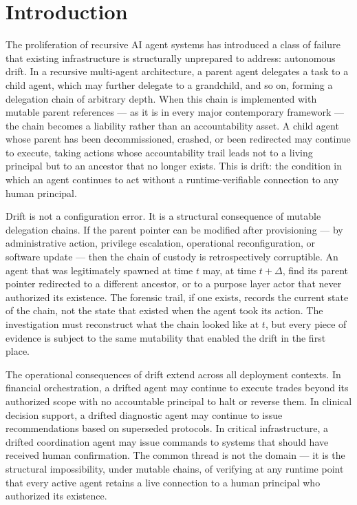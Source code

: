 \section{Introduction}
\label{sec:introduction}

The proliferation of recursive AI agent systems has introduced a class of failure that existing infrastructure is structurally unprepared to address: autonomous drift. In a recursive multi-agent architecture, a parent agent delegates a task to a child agent, which may further delegate to a grandchild, and so on, forming a delegation chain of arbitrary depth. When this chain is implemented with mutable parent references — as it is in every major contemporary framework — the chain becomes a liability rather than an accountability asset. A child agent whose parent has been decommissioned, crashed, or been redirected may continue to execute, taking actions whose accountability trail leads not to a living principal but to an ancestor that no longer exists. This is drift: the condition in which an agent continues to act without a runtime-verifiable connection to any human principal.

Drift is not a configuration error. It is a structural consequence of mutable delegation chains. If the parent pointer can be modified after provisioning — by administrative action, privilege escalation, operational reconfiguration, or software update — then the chain of custody is retrospectively corruptible. An agent that was legitimately spawned at time $t$ may, at time $t+\Delta$, find its parent pointer redirected to a different ancestor, or to a purpose layer actor that never authorized its existence. The forensic trail, if one exists, records the current state of the chain, not the state that existed when the agent took its action. The investigation must reconstruct what the chain looked like at $t$, but every piece of evidence is subject to the same mutability that enabled the drift in the first place.

The operational consequences of drift extend across all deployment contexts. In financial orchestration, a drifted agent may continue to execute trades beyond its authorized scope with no accountable principal to halt or reverse them. In clinical decision support, a drifted diagnostic agent may continue to issue recommendations based on superseded protocols. In critical infrastructure, a drifted coordination agent may issue commands to systems that should have received human confirmation. The common thread is not the domain — it is the structural impossibility, under mutable chains, of verifying at any runtime point that every active agent retains a live connection to a human principal who authorized its existence.

